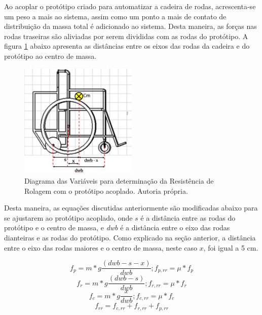 Ao acoplar o protótipo criado para automatizar a cadeira de rodas, acrescenta-se um peso a mais ao sistema, assim como um ponto a mais de contato de distribuição da massa total é adicionado ao sistema. Desta maneira, as forças nas rodas traseiras são aliviadas por serem divididas com as rodas do protótipo. A figura \ref{fig:finalmente_essa_imagem} abaixo apresenta as distâncias entre os eixos das rodas da cadeira e do protótipo ao centro de massa.

\begin{figure}[!htb]
	\centering
	\includegraphics[width = 0.5\textwidth]{figuras/resultados/finalmente_essa_imagem}
	\caption{Diagrama das Variáveis para determinação da Resistência de Rolagem com o protótipo acoplado. Autoria própria.}
	\label{fig:finalmente_essa_imagem}
\end{figure}

Desta maneira, as equações discutidas anteriormente são modificadas abaixo para se ajustarem ao protótipo acoplado, onde $s$ é a distância entre as rodas do protótipo e o centro de massa, e \textit{dwb} é a distância entre o eixo das rodas dianteiras e as rodas do protótipo. Como explicado na seção anterior, a distância entre o eixo das rodas maiores e o centro de massa, neste caso $x$, foi igual a 5 cm.

\begin{equation}
	f_p=m*g\frac{(dwb-s-x)}{dwb} ; f_{p,rr}=\mu*f_p
\end{equation}
\begin{equation}
	f_r=m*g\frac{(dwb-s)}{dwb} ; f_{r,rr}=\mu*f_r
\end{equation}
\begin{equation}
	f_c=m*g\frac{x}{dwb} ; f_{c,rr}=\mu*f_c
\end{equation}
\begin{equation}
	f_{rr}=f_{c,rr}+f_{r,rr}+f_{p,rr}
\end{equation}

